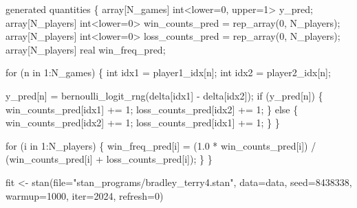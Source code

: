\documentclass[
  letterpaper,
  DIV=11,
  numbers=noendperiod]{scrartcl}
\newenvironment{Shaded}{\begin{snugshade}}{\end{snugshade}}
\newcommand{\AttributeTok}[1]{\textcolor[rgb]{0.40,0.45,0.13}{#1}}
\newcommand{\ControlFlowTok}[1]{\textcolor[rgb]{0.00,0.23,0.31}{#1}}
\newcommand{\DataTypeTok}[1]{\textcolor[rgb]{0.68,0.00,0.00}{#1}}
\newcommand{\DecValTok}[1]{\textcolor[rgb]{0.68,0.00,0.00}{#1}}
\newcommand{\FloatTok}[1]{\textcolor[rgb]{0.68,0.00,0.00}{#1}}
\newcommand{\FunctionTok}[1]{\textcolor[rgb]{0.28,0.35,0.67}{#1}}
\newcommand{\KeywordTok}[1]{\textcolor[rgb]{0.00,0.23,0.31}{#1}}
\newcommand{\NormalTok}[1]{\textcolor[rgb]{0.00,0.23,0.31}{#1}}
\newcommand{\OtherTok}[1]{\textcolor[rgb]{0.00,0.23,0.31}{#1}}
\newcommand{\StringTok}[1]{\textcolor[rgb]{0.13,0.47,0.30}{#1}}
\begin{document}
\begin{codelisting}
\begin{Shaded}
\begin{Highlighting}[]
\KeywordTok{generated quantities}\NormalTok{ \{}
  \DataTypeTok{array}\NormalTok{[N\_games] }\DataTypeTok{int}\NormalTok{\textless{}}\KeywordTok{lower}\NormalTok{=}\DecValTok{0}\NormalTok{, }\KeywordTok{upper}\NormalTok{=}\DecValTok{1}\NormalTok{\textgreater{} y\_pred;}
  \DataTypeTok{array}\NormalTok{[N\_players] }\DataTypeTok{int}\NormalTok{\textless{}}\KeywordTok{lower}\NormalTok{=}\DecValTok{0}\NormalTok{\textgreater{} win\_counts\_pred}
\NormalTok{    = rep\_array(}\DecValTok{0}\NormalTok{, N\_players);}
  \DataTypeTok{array}\NormalTok{[N\_players] }\DataTypeTok{int}\NormalTok{\textless{}}\KeywordTok{lower}\NormalTok{=}\DecValTok{0}\NormalTok{\textgreater{} loss\_counts\_pred}
\NormalTok{    = rep\_array(}\DecValTok{0}\NormalTok{, N\_players);}
  \DataTypeTok{array}\NormalTok{[N\_players] }\DataTypeTok{real}\NormalTok{ win\_freq\_pred;}

  \ControlFlowTok{for}\NormalTok{ (n }\ControlFlowTok{in} \DecValTok{1}\NormalTok{:N\_games) \{}
    \DataTypeTok{int}\NormalTok{ idx1 = player1\_idx[n];}
    \DataTypeTok{int}\NormalTok{ idx2 = player2\_idx[n];}

\NormalTok{    y\_pred[n] = bernoulli\_logit\_rng(delta[idx1] {-} delta[idx2]);}
    \ControlFlowTok{if}\NormalTok{ (y\_pred[n]) \{}
\NormalTok{      win\_counts\_pred[idx1] += }\DecValTok{1}\NormalTok{;}
\NormalTok{      loss\_counts\_pred[idx2] += }\DecValTok{1}\NormalTok{;}
\NormalTok{    \} }\ControlFlowTok{else}\NormalTok{ \{}
\NormalTok{      win\_counts\_pred[idx2] += }\DecValTok{1}\NormalTok{;}
\NormalTok{      loss\_counts\_pred[idx1] += }\DecValTok{1}\NormalTok{;}
\NormalTok{    \}}
\NormalTok{  \}}

  \ControlFlowTok{for}\NormalTok{ (i }\ControlFlowTok{in} \DecValTok{1}\NormalTok{:N\_players) \{}
\NormalTok{    win\_freq\_pred[i] =   (}\FloatTok{1.0}\NormalTok{ * win\_counts\_pred[i])}
\NormalTok{                       / (win\_counts\_pred[i] + loss\_counts\_pred[i]);}
\NormalTok{  \}}
\NormalTok{\}}
\end{Highlighting}
\end{Shaded}

\end{codelisting}

\begin{Shaded}
\begin{Highlighting}[]
\NormalTok{fit }\OtherTok{\textless{}{-}} \FunctionTok{stan}\NormalTok{(}\AttributeTok{file=}\StringTok{"stan\_programs/bradley\_terry4.stan"}\NormalTok{,}
            \AttributeTok{data=}\NormalTok{data, }\AttributeTok{seed=}\DecValTok{8438338}\NormalTok{,}
            \AttributeTok{warmup=}\DecValTok{1000}\NormalTok{, }\AttributeTok{iter=}\DecValTok{2024}\NormalTok{, }\AttributeTok{refresh=}\DecValTok{0}\NormalTok{)}
\end{Highlighting}
\end{Shaded}
\end{document}
